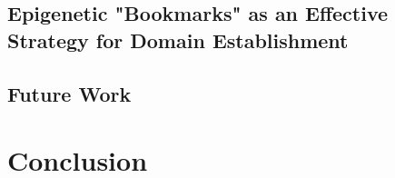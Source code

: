 \documentclass[12pt]{article}
\begin{document}
\subsection{Epigenetic "Bookmarks" as an Effective Strategy for Domain Establishment}

\subsection{Future Work}


\section{Conclusion}









\appendix

\end{document}
